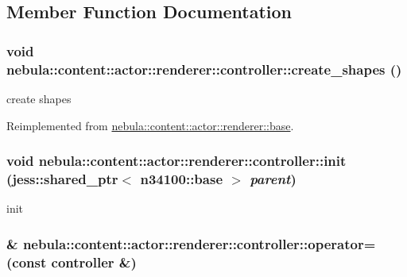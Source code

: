 \subsection{Member Function Documentation}
\hypertarget{classnebula_1_1content_1_1actor_1_1renderer_1_1controller_a5e6389f688c55cc3209bb3081dda286c}{
\subsubsection[{create\_\-shapes}]{\setlength{\rightskip}{0pt plus 5cm}void nebula::content::actor::renderer::controller::create\_\-shapes ()}}
\label{classnebula_1_1content_1_1actor_1_1renderer_1_1controller_a5e6389f688c55cc3209bb3081dda286c}


create shapes 

Reimplemented from \hyperlink{classnebula_1_1content_1_1actor_1_1renderer_1_1base_a7a8ac733753c32792feb02a89d87a0d0}{nebula::content::actor::renderer::base}.\hypertarget{classnebula_1_1content_1_1actor_1_1renderer_1_1controller_a020265cd6665f0aa5bf205aa1d0128d6}{
\subsubsection[{init}]{\setlength{\rightskip}{0pt plus 5cm}void nebula::content::actor::renderer::controller::init (jess::shared\_\-ptr$<$ {\bf n34100::base} $>$ {\em parent})}}
\label{classnebula_1_1content_1_1actor_1_1renderer_1_1controller_a020265cd6665f0aa5bf205aa1d0128d6}


init \hypertarget{classnebula_1_1content_1_1actor_1_1renderer_1_1controller_ac8f4e2e48a0a0652e469313b798bfac8}{
\subsubsection[{operator=}]{\& nebula::content::actor::renderer::controller::operator= (const {\bf controller} \&)}}
\label{classnebula_1_1content_1_1actor_1_1renderer_1_1controller_ac8f4e2e48a0a0652e469313b798bfac8}


